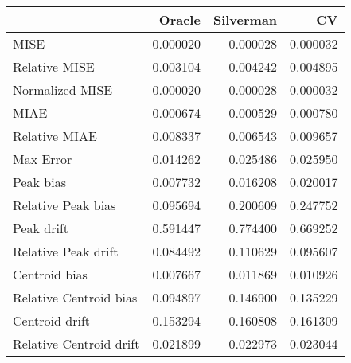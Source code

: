 \begin{tabular}{lrrr}
  \hline
 & Oracle & Silverman & CV \\ 
  \hline
MISE & 0.000020 & 0.000028 & 0.000032 \\ 
  Relative MISE & 0.003104 & 0.004242 & 0.004895 \\ 
  Normalized MISE & 0.000020 & 0.000028 & 0.000032 \\ 
  MIAE & 0.000674 & 0.000529 & 0.000780 \\ 
  Relative MIAE & 0.008337 & 0.006543 & 0.009657 \\ 
  Max Error & 0.014262 & 0.025486 & 0.025950 \\ 
  Peak bias & 0.007732 & 0.016208 & 0.020017 \\ 
  Relative Peak bias & 0.095694 & 0.200609 & 0.247752 \\ 
  Peak drift & 0.591447 & 0.774400 & 0.669252 \\ 
  Relative Peak drift & 0.084492 & 0.110629 & 0.095607 \\ 
  Centroid bias & 0.007667 & 0.011869 & 0.010926 \\ 
  Relative Centroid bias & 0.094897 & 0.146900 & 0.135229 \\ 
  Centroid drift & 0.153294 & 0.160808 & 0.161309 \\ 
  Relative Centroid drift & 0.021899 & 0.022973 & 0.023044 \\ 
   \hline
\end{tabular}
